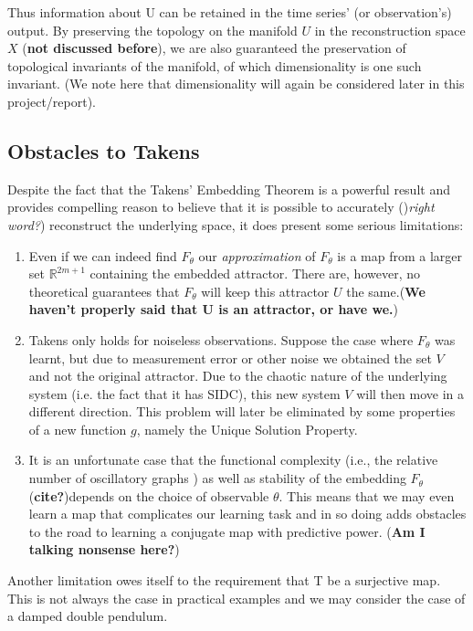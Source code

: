 \documentclass[12 pt]{article}
\newcommand{\Ftheta}{\ensuremath{F_\theta}}
\begin{document}
Thus information about U can be retained in the time series' (or observation's) output. By preserving the topology on the manifold $U$ in the reconstruction space $X$ (\textbf{not discussed before}), we are also guaranteed the preservation of topological invariants of the manifold, of which dimensionality is one such invariant. (We note here that dimensionality will again be considered later in this project/report).

\subsection{Obstacles to Takens}
Despite the fact that the Takens' Embedding Theorem is a powerful result and provides compelling reason to believe that it is possible to accurately ()\emph{right word?}) reconstruct the underlying space, it does present some serious limitations:
\vspace{-5mm}
\begin{enumerate}
\item Even if we can indeed find \Ftheta{}  our \emph{approximation} of \Ftheta{}  is a map from a larger set $\mathbb{R}^{2m+1}$ containing the embedded attractor. There are, however, no theoretical guarantees that \Ftheta{}  will keep this attractor $U$  the same.(\textbf{We haven't properly said that U is an attractor, or have we.})
\item Takens only holds for noiseless observations. Suppose the case where \Ftheta{} was learnt, but due to measurement error or other noise we obtained the set $V$ and not the original attractor. Due to the chaotic nature of the underlying system (i.e. the fact that it has SIDC), this new system $V$ will then move in a different direction. This problem will later be eliminated by some properties of a new function $g$, namely the Unique Solution Property. 
\item It is an unfortunate case that the functional complexity (i.e., the relative number of oscillatory graphs \cite{manjunath2021universal}) as well as stability of the embedding \Ftheta{} (\textbf{cite?})depends on the choice of observable $\theta$. This means that we may even learn a map that complicates our learning task and in so doing adds obstacles to the road to learning a conjugate map with predictive power. (\textbf{Am I talking nonsense here?})
\end{enumerate}

Another limitation owes itself to the requirement that T be a surjective map. This is not always the case in practical examples and we may consider the case of a damped double pendulum. 
\end{document}
